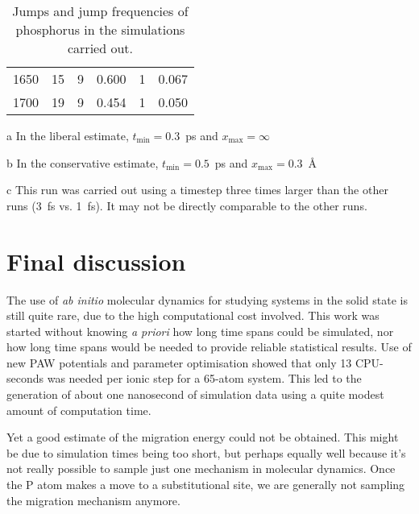 \documentclass[11pt,bibliography=totoc,index=totoc]{scrbook}   %
\begin{document}
\begin{table}[htbp]
\begin{threeparttable}[htbp]
\begin{tabular}{rrrrrr}
        1650 &  15 &  9 & 0.600 &  1 & 0.067 \\
        1700 &  19 &  9 & 0.454 &  1 & 0.050 \\
      \bottomrule
    \end{tabular}
    {\footnotesize
    \begin{tablenotes}
      \item[a] In the liberal estimate, $t_{\text{min}}=0.3$~ps and $x_{\text{max}}=\infty$
      \item[b] In the conservative estimate, $t_{\text{min}}=0.5$~ps and $x_{\text{max}}=0.3$~Å
      \item[c] This run was carried out using a timestep three times larger than the other runs (3~fs vs. 1~fs). 
          It may not be directly comparable to the other runs.
    \end{tablenotes}
    }
  \end{threeparttable}
  \caption{Jumps and jump frequencies of phosphorus in the simulations carried out.}
  \label{tab:jumps}
\end{table}



%
\clearpage
\section{Final discussion}
%

The use of \textit{ab initio} molecular dynamics for studying systems in the solid state is still quite rare, due to the high computational cost involved.
This work was started without knowing \textit{a priori} how long time spans could be simulated, 
nor how long time spans would be needed to provide reliable statistical results.
Use of new PAW potentials and parameter optimisation showed that only 13 CPU-seconds was needed per ionic step for a 65-atom system.
This led to the generation of about one nanosecond of simulation data using a quite modest amount of computation time.

Yet a good estimate of the migration energy could not be obtained.
This might be due to simulation times being too short, but perhaps equally well
because it's not really possible to sample just one mechanism in molecular dynamics. 
Once the P atom makes a move to a substitutional site, we are generally not sampling the migration mechanism anymore.
\end{document}
